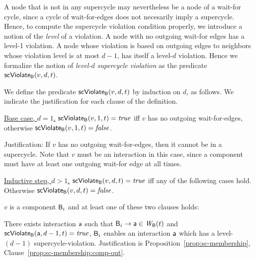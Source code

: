 A node that is not in any supercycle may nevertheless be a node of a wait-for cycle, since a cycle
of wait-for-edges does not necesarily imply a supercycle. Hence, to compute the supercycle violation
condition properly, we introduce a notion of the \emph{level} of a violation. A node with no
outgoing wait-for edges has a level-1 violation. A node whose violation is based on outgoing edges
to neighbors whose violation level is at most $d-1$, has itself a level-$d$ violation.  Hence we
formalize the notion of \emph{level-$d$ supercycle violation} as the predicate $\mathsf{scViolate}_{\mathsf{B}}(v,d,t)$.


\label{def:supercycle-violation}
\label{def:supercycle.violation}
We define the predicate $\mathsf{scViolate}_{\mathsf{B}}(v,d,t)$ by induction on $d$, as follows. We indicate the
justification for each clause of the definition.

\noindent
\ul{Base case, $d=1$.} $\mathsf{scViolate}_{\mathsf{B}}(v,1,t) = \mathit{true}$ iff $v$ has no outgoing wait-for-edges, otherwise $\mathsf{scViolate}_{\mathsf{B}}(v,1,t) = \mathit{false}$.

Justification: If $v$ has no outgoing wait-for-edges, then it cannot be in a supercycle.  Note that $v$ must be an
interaction in this case, since a component must have at least one outgoing wait-for edge at all times.

\noindent
\ul{Inductive step, $d > 1$.}  $\mathsf{scViolate}_{\mathsf{B}}(v,d,t) = \mathit{true}$ iff any of the following cases hold. Otherwise 
$\mathsf{scViolate}_{\mathsf{B}}(v,d,t) = \mathit{false}$.

\bn

\item $v$ is a component $\mathsf{B}_i$ and at least one of these two clauses holds:
   \bn

   \item \label{def:supercycle.violation.component.out}
         There exists interaction $\mathsf{a}$ such that $\mathsf{B}_i \rightarrow \mathsf{a} \in \mathit{W}_{\mathsf{B}}({t})$ and $\mathsf{scViolate}_{\mathsf{B}}(\mathsf{a},d-1,t) = \mathit{true}$,
         \ie $\mathsf{B}_i$ enables an interaction $\mathsf{a}$ which has a level-$(d-1)$ supercycle-violation.
    Justification is Proposition~\ref{prop:sc-membership}, Clause~\ref{prop:sc-membership:comp-out}.


